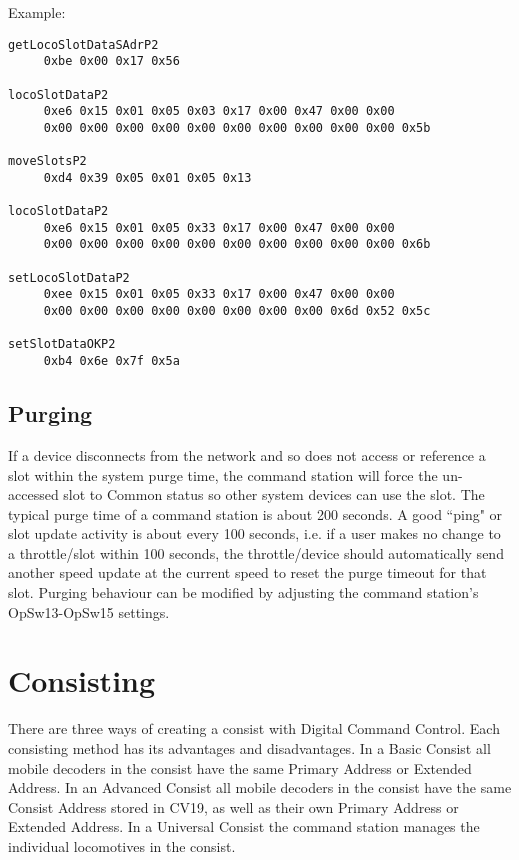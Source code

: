 Example:

\begin{verbatim}
getLocoSlotDataSAdrP2
     0xbe 0x00 0x17 0x56 
     
locoSlotDataP2
     0xe6 0x15 0x01 0x05 0x03 0x17 0x00 0x47 0x00 0x00 
     0x00 0x00 0x00 0x00 0x00 0x00 0x00 0x00 0x00 0x00 0x5b 

moveSlotsP2
     0xd4 0x39 0x05 0x01 0x05 0x13 

locoSlotDataP2
     0xe6 0x15 0x01 0x05 0x33 0x17 0x00 0x47 0x00 0x00 
     0x00 0x00 0x00 0x00 0x00 0x00 0x00 0x00 0x00 0x00 0x6b 

setLocoSlotDataP2
     0xee 0x15 0x01 0x05 0x33 0x17 0x00 0x47 0x00 0x00 
     0x00 0x00 0x00 0x00 0x00 0x00 0x00 0x00 0x6d 0x52 0x5c 

setSlotDataOKP2
     0xb4 0x6e 0x7f 0x5a 
\end{verbatim}
\normalsize

\subsection{Purging}
If a device disconnects from the network and so does not access or reference a slot within the system purge time, the command station will force the un-accessed slot to \gls{Common} status so other system devices can use the slot. The typical purge time of a command station is about 200 seconds. A good ``ping" or slot update activity is about every 100 seconds, i.e. if a user makes no change to a throttle/slot within 100 seconds, the throttle/device should automatically send another speed update at the current speed to reset the purge timeout for that slot. Purging behaviour can be modified by adjusting the command station's OpSw13-OpSw15 settings.

\section{Consisting}

There are three ways of creating a consist with Digital Command Control. Each consisting method has its advantages and disadvantages. In a \gls{Basic Consist} all mobile decoders in the consist have the same \gls{Primary Address} or \gls{Extended Address}. In an \gls{Advanced Consist} all mobile decoders in the consist have the same \gls{Consist Address} stored in CV19, as well as their own \gls{Primary Address} or \gls{Extended Address}. In a \gls{Universal Consist} the command station manages the individual locomotives in the consist.\\


